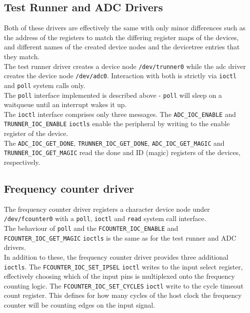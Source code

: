 \subsection{Test Runner and ADC Drivers}
Both of these drivers are effectively the same with only minor differences such as the
address of the registers to match the differing register maps of the devices, and different
names of the created device nodes and the devicetree entries that they match.
\\

The test runner driver creates a device node \texttt{/dev/trunner0} while the adc
driver creates the device node \texttt{/dev/adc0}. Interaction with both is strictly
via \texttt{ioctl} and \texttt{poll} system calls only.
\\

The \texttt{poll} interface implemented is described above - \texttt{poll} will
sleep on a waitqueue until an interrupt wakes it up.
\\

The \texttt{ioctl} interface comprises only three messages. The \texttt{ADC\_IOC\_ENABLE} and
\texttt{TRUNNER\_IOC\_ENABLE} \texttt{ioctls} enable the peripheral by writing to the
enable register of the device.
\\

The \texttt{ADC\_IOC\_GET\_DONE}, \texttt{TRUNNER\_IOC\_GET\_DONE},
\texttt{ADC\_IOC\_GET\_MAGIC} and
\\
\texttt{TRUNNER\_IOC\_GET\_MAGIC} read the done and
ID (magic) registers of the devices, respectively.



\subsection{Frequency counter driver}
The frequency counter driver registers a character device node under
\\
\texttt{/dev/fcounter0}
with a \texttt{poll}, \texttt{ioctl} and \texttt{read} system call interface.
\\

The behaviour of \texttt{poll} and the \texttt{FCOUNTER\_IOC\_ENABLE} and
\\
\texttt{FCOUNTER\_IOC\_GET\_MAGIC}
\texttt{ioctls} is the same as for the test runner and ADC drivers.
\\

In addition to these, the frequency counter driver provides three additional \texttt{ioctls}.
The \texttt{FCOUNTER\_IOC\_SET\_IPSEL} \texttt{ioctl} writes to the input select register,
effectively choosing which of the input pins is multiplexed onto the frequency counting logic.
The \texttt{FCOUNTER\_IOC\_SET\_CYCLES} \texttt{ioctl} write to the cycle timeout count register. This
defines for how many cycles of the host clock the frequency counter will be counting edges on the
input signal.
\\

